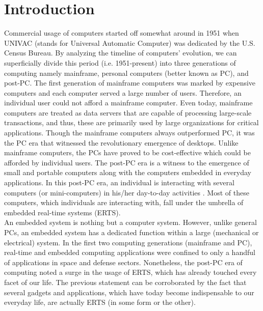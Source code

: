 \documentclass[12pt]{report}
\begin{document}
\chapter{Introduction}
Commercial usage of computers started off somewhat around in 1951 when UNIVAC (stands for Universal Automatic Computer) was dedicated by the U.S. Census Bureau. By analyzing the timeline of computers' evolution, we can superficially divide this period (i.e. 1951-present) into three generations of computing namely mainframe, personal computers (better known as PC), and post-PC. The first generation of mainframe computers was marked by expensive computers and each computer served a large number of users. Therefore, an individual user could not afford a mainframe computer. Even today, mainframe computers are treated as data servers that are capable of processing large-scale transactions, and thus, these are primarily used by large organizations for critical applications. Though the mainframe computers always outperformed PC, it was the PC era that witnessed the revolutionary emergence of desktops. Unlike mainframe computers, the PCs have proved to be cost-effective which could be afforded by individual users.  %
The post-PC era is a witness to the emergence of small and portable computers along with the computers embedded in everyday applications. In this post-PC era, an individual is interacting with several computers (or mini-computers) in his/her day-to-day activities  \cite{NPTEL}. Most of these computers, which individuals are interacting with, fall under the umbrella of embedded real-time systems (ERTS). \\

An embedded system is nothing but a computer system. However, unlike general PCs, an embedded system has a dedicated function within a large (mechanical or electrical) system. In the first two computing generations (mainframe and PC), real-time and embedded computing applications were confined to only a handful of applications in space and defense sectors. Nonetheless, the post-PC era of computing noted a surge in the usage of ERTS, which has already touched every facet of our life. The previous statement can be corroborated by the fact that several gadgets and applications, which have today become indispensable to our everyday life, are actually ERTS (in some form or the other).  \\
\end{document}
